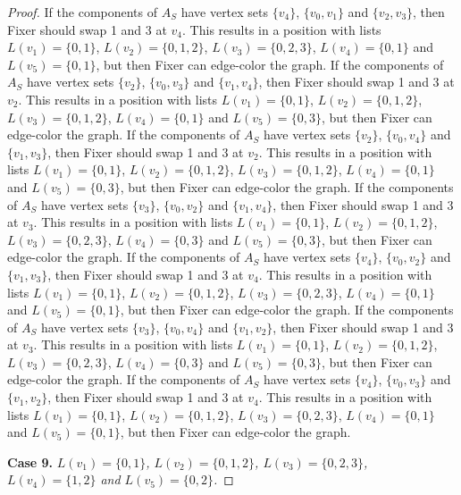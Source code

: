 \documentclass[12pt]{amsart}
\theoremstyle{plain}
\theoremstyle{definition}
\theoremstyle{remark}
\begin{document}
\begin{proof}
If the components of $A_S$ have vertex sets $\{v_4\}$, $\{v_0, v_1\}$ and $\{v_2, v_3\}$, then Fixer should swap 1 and 3 at $v_4$. This results in a position with lists $L(v_1) = \{0, 1\}$, $L(v_2) = \{0, 1, 2\}$, $L(v_3) = \{0, 2, 3\}$, $L(v_4) = \{0, 1\}$ and $L(v_5) = \{0, 1\}$, but then Fixer can edge-color the graph.
If the components of $A_S$ have vertex sets $\{v_2\}$, $\{v_0, v_3\}$ and $\{v_1, v_4\}$, then Fixer should swap 1 and 3 at $v_2$. This results in a position with lists $L(v_1) = \{0, 1\}$, $L(v_2) = \{0, 1, 2\}$, $L(v_3) = \{0, 1, 2\}$, $L(v_4) = \{0, 1\}$ and $L(v_5) = \{0, 3\}$, but then Fixer can edge-color the graph.
If the components of $A_S$ have vertex sets $\{v_2\}$, $\{v_0, v_4\}$ and $\{v_1, v_3\}$, then Fixer should swap 1 and 3 at $v_2$. This results in a position with lists $L(v_1) = \{0, 1\}$, $L(v_2) = \{0, 1, 2\}$, $L(v_3) = \{0, 1, 2\}$, $L(v_4) = \{0, 1\}$ and $L(v_5) = \{0, 3\}$, but then Fixer can edge-color the graph.
If the components of $A_S$ have vertex sets $\{v_3\}$, $\{v_0, v_2\}$ and $\{v_1, v_4\}$, then Fixer should swap 1 and 3 at $v_3$. This results in a position with lists $L(v_1) = \{0, 1\}$, $L(v_2) = \{0, 1, 2\}$, $L(v_3) = \{0, 2, 3\}$, $L(v_4) = \{0, 3\}$ and $L(v_5) = \{0, 3\}$, but then Fixer can edge-color the graph.
If the components of $A_S$ have vertex sets $\{v_4\}$, $\{v_0, v_2\}$ and $\{v_1, v_3\}$, then Fixer should swap 1 and 3 at $v_4$. This results in a position with lists $L(v_1) = \{0, 1\}$, $L(v_2) = \{0, 1, 2\}$, $L(v_3) = \{0, 2, 3\}$, $L(v_4) = \{0, 1\}$ and $L(v_5) = \{0, 1\}$, but then Fixer can edge-color the graph.
If the components of $A_S$ have vertex sets $\{v_3\}$, $\{v_0, v_4\}$ and $\{v_1, v_2\}$, then Fixer should swap 1 and 3 at $v_3$. This results in a position with lists $L(v_1) = \{0, 1\}$, $L(v_2) = \{0, 1, 2\}$, $L(v_3) = \{0, 2, 3\}$, $L(v_4) = \{0, 3\}$ and $L(v_5) = \{0, 3\}$, but then Fixer can edge-color the graph.
If the components of $A_S$ have vertex sets $\{v_4\}$, $\{v_0, v_3\}$ and $\{v_1, v_2\}$, then Fixer should swap 1 and 3 at $v_4$. This results in a position with lists $L(v_1) = \{0, 1\}$, $L(v_2) = \{0, 1, 2\}$, $L(v_3) = \{0, 2, 3\}$, $L(v_4) = \{0, 1\}$ and $L(v_5) = \{0, 1\}$, but then Fixer can edge-color the graph.

\noindent\textbf{Case 9.  }\textit{$L(v_1) = \{0, 1\}$, $L(v_2) = \{0, 1, 2\}$, $L(v_3) = \{0, 2, 3\}$, $L(v_4) = \{1, 2\}$ and $L(v_5) = \{0, 2\}$.}


\end{proof}
\end{document}
